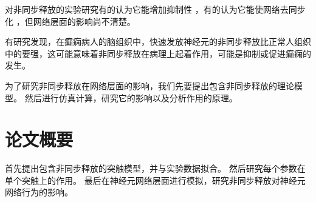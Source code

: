 对非同步释放的实验研究有的认为它能增加抑制性 \cite{Medrihan2014}，有的认为它能使网络去同步化 \cite{Manseau2010}，但网络层面的影响尚不清楚。

有研究发现，在癫痫病人的脑组织中，快速发放神经元的非同步释放比正常人组织中的要强，这可能意味着非同步释放在病理上起着作用，可能是抑制或促进癫痫的发生。

为了研究非同步释放在网络层面的影响，我们先要提出包含非同步释放的理论模型。
然后进行仿真计算，研究它的影响以及分析作用的原理。

\section{论文概要}
\label{section:background:outline}
首先提出包含非同步释放的突触模型，并与实验数据拟合。
然后研究每个参数在单个突触上的作用。
最后在神经元网络层面进行模拟，研究非同步释放对神经元网络行为的影响。
